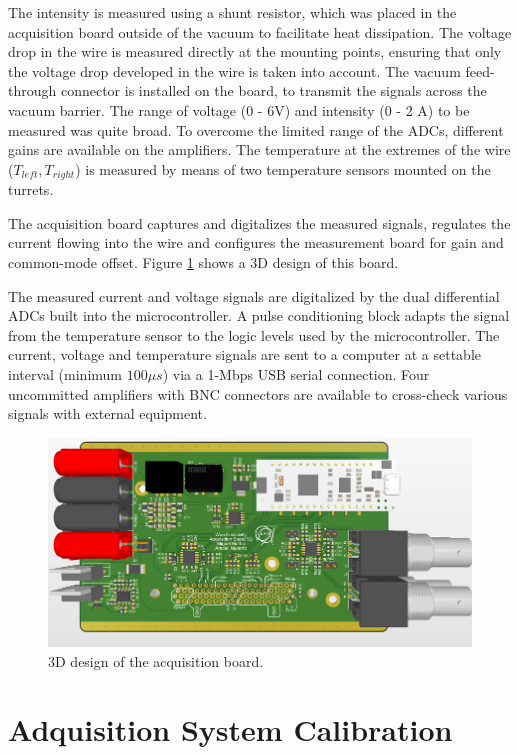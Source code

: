 The intensity is measured using a shunt resistor, which was placed in the acquisition board outside of the vacuum to facilitate heat dissipation. The voltage drop in the wire is measured directly at the mounting points, ensuring that only the voltage drop developed in the wire is taken into account. The vacuum feed-through connector is installed on the board, to transmit the signals across the vacuum barrier. The range of voltage (0 - 6V) and intensity (0 - 2 A) to be measured was quite broad. To overcome the limited range of the ADCs, different gains are available on the amplifiers. The temperature at the extremes of the wire ($T_{left}, T_{right}$) is measured by means of two temperature sensors mounted on the turrets. 

The acquisition board captures and digitalizes the measured signals, regulates the current flowing into the wire and configures the measurement board for gain and common-mode offset. Figure \ref{fig:AdquisitionBoard} shows a 3D design of this board. 

The measured current and voltage signals are digitalized by the dual differential ADCs built into the microcontroller. A pulse conditioning block adapts the signal from the temperature sensor to the logic levels used by the microcontroller. The current, voltage and temperature signals are sent to a computer at a settable interval (minimum $100 \mu s$) via a 1-Mbps USB serial connection. Four uncommitted amplifiers with BNC connectors are available to cross-check various signals with external equipment. 

\begin{figure}[h]
    \centering
    \includegraphics[width=0.8\columnwidth]{3DBoardDesigns/AdquisitionBoard.png}
    \caption{3D design of the acquisition board.}
    \label{fig:AdquisitionBoard}
\end{figure}

\section{Adquisition System Calibration}

